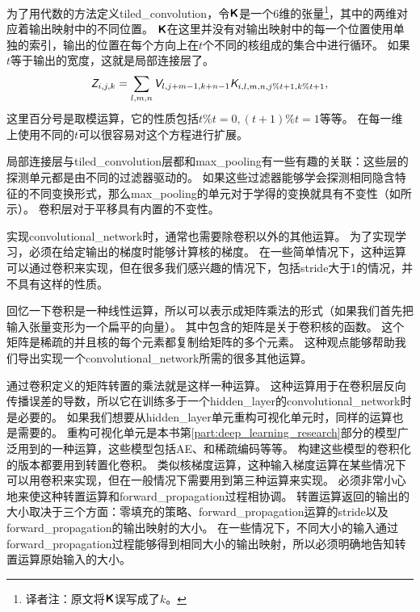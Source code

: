  
为了用代数的方法定义\gls{tiled_convolution}，令$\textsf{\textbf{K}}$是一个6维的张量\footnote{译者注：原文将$\textsf{\textbf{K}}$误写成了$k$。}，其中的两维对应着输出映射中的不同位置。%
$\textsf{\textbf{K}}$在这里并没有对输出映射中的每一个位置使用单独的索引，输出的位置在每个方向上在$t$个不同的核组成的集合中进行循环。
如果$t$等于输出的宽度，这就是局部连接层了。
\begin{equation}
\textit{\textsf{Z}}_{i, j, k} = \sum_{l, m, n} \textit{\textsf{V}}_{l, j+m-1, k+n-1} \textit{\textsf{K}}_{i, l, m, n, j\% t +1, k\% t+1},
\end{equation}
这里百分号是取模运算，它的性质包括$t\% t =0, (t+1)\% t = 1$等等。
在每一维上使用不同的$t$可以很容易对这个方程进行扩展。
 
  
 
局部连接层与\gls{tiled_convolution}层都和\gls{max_pooling}有一些有趣的关联：这些层的探测单元都是由不同的过滤器驱动的。
如果这些过滤器能够学会探测相同隐含特征的不同变换形式，那么\gls{max_pooling}的单元对于学得的变换就具有不变性（如所示）。
卷积层对于平移具有内置的不变性。
 
 
实现\gls{convolutional_network}时，通常也需要除卷积以外的其他运算。
为了实现学习，必须在给定输出的梯度时能够计算核的梯度。
在一些简单情况下，这种运算可以通过卷积来实现，但在很多我们感兴趣的情况下，包括\gls{stride}大于1的情况，并不具有这样的性质。

回忆一下卷积是一种线性运算，所以可以表示成矩阵乘法的形式（如果我们首先把输入张量变形为一个扁平的向量）。
其中包含的矩阵是关于卷积核的函数。
这个矩阵是稀疏的并且核的每个元素都复制给矩阵的多个元素。
这种观点能够帮助我们导出实现一个\gls{convolutional_network}所需的很多其他运算。

通过卷积定义的矩阵转置的乘法就是这样一种运算。
这种运算用于在卷积层反向传播误差的导数，所以它在训练多于一个\gls{hidden_layer}的\gls{convolutional_network}时是必要的。
如果我们想要从\gls{hidden_layer}单元重构可视化单元时，同样的运算也是需要的\citep{Simard92-short}。
重构可视化单元是本书第\ref{part:deep_learning_research}部分的模型广泛用到的一种运算，这些模型包括\gls{AE}、和稀疏编码等等。
构建这些模型的卷积化的版本都要用到转置化卷积。
类似核梯度运算，这种输入梯度运算在某些情况下可以用卷积来实现，但在一般情况下需要用到第三种运算来实现。%
必须非常小心地来使这种转置运算和\gls{forward_propagation}过程相协调。
转置运算返回的输出的大小取决于三个方面：零填充的策略、\gls{forward_propagation}运算的\gls{stride}以及\gls{forward_propagation}的输出映射的大小。
在一些情况下，不同大小的输入通过\gls{forward_propagation}过程能够得到相同大小的输出映射，所以必须明确地告知转置运算原始输入的大小。

